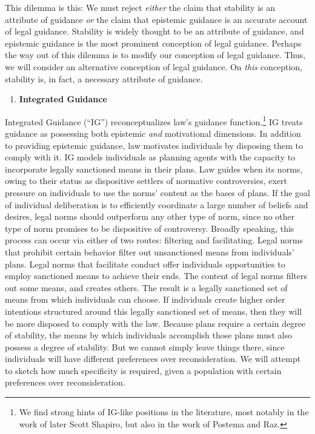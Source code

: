 This dilemma is this: We must reject \emph{either} the claim that
stability is an attribute of guidance \emph{or} the claim that epistemic
guidance is an accurate account of legal guidance. Stability is widely
thought to be an attribute of guidance, and epistemic guidance is the
most prominent conception of legal guidance. Perhaps the way out of this
dilemma is to modify our conception of legal guidance. Thus, we will
consider an alternative conception of legal guidance. On \emph{this}
conception, stability is, in fact, a necessary attribute of guidance.

\begin{enumerate}
\def\labelenumi{\arabic{enumi}.}
\item
  \textbf{Integrated Guidance}
\end{enumerate}

Integrated Guidance (``IG'') reconceptualizes law's guidance
function.\footnote{We find strong hints of IG-like positions in the
  literature, most notably in the work of later Scott Shapiro, but also
  in the work of Postema and Raz.} IG treats guidance as possessing both
epistemic \emph{and} motivational dimensions. In addition to providing
epistemic guidance, law motivates individuals by disposing them to
comply with it. IG models individuals as planning agents with the
capacity to incorporate legally sanctioned means in their plans. Law
guides when its norms, owing to their status as dispositive settlers of
normative controversies, exert pressure on individuals to use the norms'
content as the bases of plans. If the goal of individual deliberation is
to efficiently coordinate a large number of beliefs and desires, legal
norms should outperform any other type of norm, since no other type of
norm promises to be dispositive of controversy. Broadly speaking, this
process can occur via either of two routes: filtering and facilitating.
Legal norms that prohibit certain behavior filter out unsanctioned means
from individuals' plans. Legal norms that facilitate conduct offer
individuals opportunities to employ sanctioned means to achieve their
ends. The content of legal norms filters out some means, and creates
others. The result is a legally sanctioned set of means from which
individuals can choose. If individuals create higher order intentions
structured around this legally sanctioned set of means, then they will
be more disposed to comply with the law. Because plans require a certain
degree of stability, the means by which individuals accomplish those
plans must also possess a degree of stability. But we cannot simply
leave things there, since individuals will have different preferences
over reconsideration. We will attempt to sketch how much specificity is
required, given a population with certain preferences over
reconsideration.

